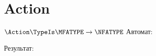 \section{Action}
\begin{frame}{$\Action\TypeIs\MFATYPE\to\NFATYPE$}
	Автомат:

	Результат:

\end{frame}